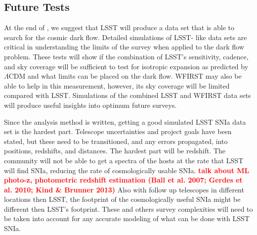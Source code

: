 \documentclass[apj, iop]{emulateapj}
\newcommand{\sn}{SNIa}
\newcommand{\todo}[1]{\textbf{\textcolor{red}{#1}}}
\newcommand{\lcdm}{$\Lambda$CDM}     %
\begin{document}
\subsection{Future Tests}\label{future-tests}

At the end of \cite{Mathews16}, we suggest that LSST will produce a data set
that is able to search for the cosmic dark flow. Detailed simulations of LSST-
like data sets are critical in understanding the limits of the survey when
applied to the dark flow problem. These tests will show if the combination of
LSST's sensitivity, cadence, and sky coverage will be sufficient to test for
isotropic expansion as predicted by \lcdm{} and what limits can be placed on the
dark flow. WFIRST may also be able to help in this measurement, however, its sky
coverage will be limited compared with LSST. Simulations of the combined LSST
and WFIRST data sets will produce useful insights into optimum future surveys.

Since the analysis method is written, getting a good simulated LSST \sn{} data
set is the hardest part. Telescope uncertainties and project goals have been
stated, but these need to be transitioned, and any errors propagated, into
positions, redshifts, and distances. The hardest part will be redshift. The
community will not be able to get a spectra of the hosts at the rate that LSST
will find \sn, reducing the rate of cosmologically usable \sn. \todo{talk about
ML photo-z, photometric redshift estimation (Ball et al. 2007; Gerdes et al.
2010; Kind & Brunner 2013)} Also with follow up telescopes in different
locations then LSST, the footprint of the cosmologically useful \sn{} might be
different then LSST's footprint. These and others survey complexities will need
to be taken into account for any accurate modeling of what can be done with LSST
\sn{}.
\end{document}
